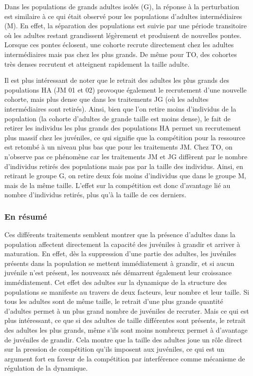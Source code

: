 Dans les populations de grands adultes isolés (G), la réponse à la perturbation
est similaire à ce qui était observé pour les populations d'adultes
intermédiaires (M). En effet, la séparation des populations est suivie par une
période transitoire où les adultes restant grandissent légèrement et produisent
de nouvelles pontes. Lorsque ces pontes éclosent, une cohorte recrute
directement chez les adultes intermédiaires mais pas chez les plus grands. De
même pour TO, des cohortes très denses recrutent et atteignent rapidement la
taille adulte. 

Il est plus intéressant de noter que le retrait des adultes les plus grands des
populations HA  (JM 01 et 02) provoque également le recrutement d'une nouvelle
cohorte, mais plus dense que dans les traitements JG (où les adultes
intermédiaires sont retirés). Ainsi, bien que l'on retire moins d'individus
de la population (la cohorte d'adultes de grande taille est moins dense), le
fait de retirer les individus les plus grands des populations HA permet un
recrutement plus massif chez les juvéniles, ce qui signifie que la compétition
pour la ressource est retombé à un niveau plus bas que pour les traitements JM.
Chez TO, on n'observe pas ce phénomène car les traitements JM et JG diffèrent
par le nombre d'individus retirés des populations mais pas par la taille des
individus. Ainsi, en retirant le groupe G, on retire deux fois moins d'individus
que dans le groupe M, mais de la même taille. L'effet sur la compétition est
donc d'avantage lié au nombre d'individus retirés, plus qu'à la taille de ces
derniers. 

\subsubsection{En résumé}

Ces différents traitements semblent montrer que la présence d'adultes dans la
population affectent directement la capacité des juvéniles à grandir et arriver
à maturation. En effet, dès la suppression d'une partie des adultes, les
juvéniles présents dans la population se mettent immédiatement à grandir, et si
aucun juvénile n'est présent, les nouveaux nés démarrent également leur
croissance immédiatement. Cet effet des adultes sur la dynamique de la structure
des populations se manifeste au travers de deux facteurs, leur nombre et leur
taille. Si tous les adultes sont de même taille, le retrait d'une plus grande
quantité d'adultes permet à un plus grand nombre de juvéniles de recruter. Mais
ce qui est plus intéressant, ce que si des adultes de taille différentes sont
présents, le retrait des adultes les plus grands, même s'ils sont moins nombreux
permet à d'avantage de juvéniles de grandir. Cela montre que la taille des
adultes joue un rôle direct sur la pression de compétition qu'ils imposent aux
juvéniles, ce qui est un argument fort en faveur de la compétition par
interférence comme mécanisme de régulation de la dynamique. 

